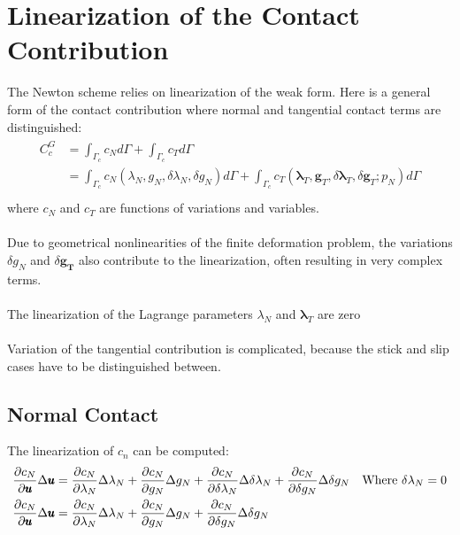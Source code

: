 \documentclass[12pt,3p]{article}
\numberwithin{equation}{section}
\begin{document}
\section{Linearization of the Contact Contribution}
The Newton scheme relies on linearization of the weak form. Here is a general form of the contact contribution where normal and tangential contact terms are distinguished: 
\begin{align}\label{6113}
\begin{split}
C_c^G &= \int_{\Gamma_c} c_N d \Gamma + \int_{\Gamma_c} c_T d \Gamma \\
	&= \int_{\Gamma_c} c_N (\lambda_N, g_N, \delta \lambda_N, \delta g_N) d \Gamma + \int_{\Gamma_c} c_T (\pmb{\lambda}_T, \pmb{g}_T, \delta \pmb{\lambda}_T, \delta \pmb{g}_T; p_N)d \Gamma \\
\end{split}
\end{align}
where $c_N$ and $c_T$ are functions of variations and variables. \\ \\
Due to geometrical nonlinearities of the finite deformation problem, the variations $\delta g_N$ and $\delta \pmb{g_T}$ also contribute to the linearization, often resulting in very complex terms. \\ \\
The linearization of the Lagrange parameters $\lambda_N$ and $\pmb{\lambda}_T$ are zero \\ \\
Variation of the tangential contribution is complicated, because the stick and slip cases have to be distinguished between. 

\subsection{Normal Contact}
The linearization of $c_n$ can be computed: 
\begin{align}\label{6114}
\begin{split}
\pdv{c_N}{\pmb{u}} \Delta \pmb{u} &= \pdv{c_N}{\lambda_N} \Delta \lambda_N + \pdv{c_N}{g_N} \Delta g_N + \pdv{c_N}{\delta \lambda_N} \Delta \delta \lambda_N + \pdv{c_N}{\delta g_N} \Delta \delta g_N \quad \text{Where } \delta \lambda_N = 0 \\
\pdv{c_N}{\pmb{u}} \Delta \pmb{u} &= \pdv{c_N}{\lambda_N} \Delta \lambda_N + \pdv{c_N}{g_N} \Delta g_N + \pdv{c_N}{\delta g_N} \Delta \delta g_N 
\end{split}
\end{align}
\end{document}
